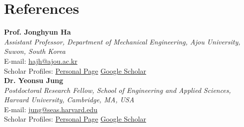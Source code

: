 \documentclass[a4paper,10pt]{article}
\newcommand{\sep}{\hspace{6pt}\textcolor{muted}{\textbar}\hspace{6pt}}
\begin{document}

\section*{References}
\textbf{Prof. Jonghyun Ha}\\
\textit{Assistant Professor, Department of Mechanical Engineering, Ajou University, Suwon, South Korea}\\
E-mail: \href{mailto:hajh@ajou.ac.kr}{hajh@ajou.ac.kr}\\
Scholar Profiles:
\href{https://www.softlab.ajou.ac.kr/people-ha}{Personal Page} \sep
\href{https://scholar.google.com/citations?user=H73RmsAAAAAJ}{Google Scholar}\\[5pt]

\textbf{Dr. Yeonsu Jung}\\
\textit{Postdoctoral Research Fellow, School of Engineering and Applied Sciences, Harvard University, Cambridge, MA, USA}\\
E-mail: \href{mailto:jung@seas.harvard.edu}{jung@seas.harvard.edu}\\
Scholar Profiles:
\href{https://yeonsu-jung.github.io}{Personal Page} \sep
\href{https://scholar.google.com/citations?user=BMZc1CcAAAAJ}{Google Scholar}
\end{document}
